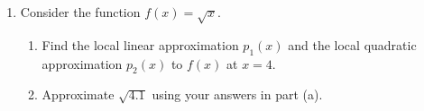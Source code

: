 \documentclass[12pt]{article}
\newif\ifans
\begin{document}
\begin{enumerate}

\item Consider the function $f(x)=\sqrt{x}$.

\begin{enumerate}

\item Find the local linear approximation $p_1(x)$ and the local quadratic approximation $p_2(x)$ to $f(x)$ at $x=4$.

\ifans{\fbox{\parbox{1\linewidth}{
$p_1(x)=2+\frac{1}{4}(x-4)$ \\ \\
$p_2(x)=2+\frac{1}{4}(x-4)-\frac{1}{64}(x-4)^2$ \\ \\
Note that $p_1(x)$ and $p_2(x)$ are just the 1st and 2nd Taylor polynomials for $f(x)$ about $x=4$. }}}\fi

\item Approximate $\sqrt{4.1}$ using your answers in part (a).

\ifans{\fbox{\parbox{1\linewidth}{
$p_1(4.1)=2+\frac{1}{4}(4.1-4)=\frac{81}{40}=2.025$ \\ \\
$p_2(4.1)=2+\frac{1}{4}(4.1-4)-\frac{1}{64}(4.1-4)^2=\frac{81}{40}-\frac{1}{6400}=2.02484375$ \\ \\
Calculator: $\sqrt{4.1} \approx 2.024845673$.  }}}\fi

\end{enumerate}

\end{enumerate}
\end{document}
